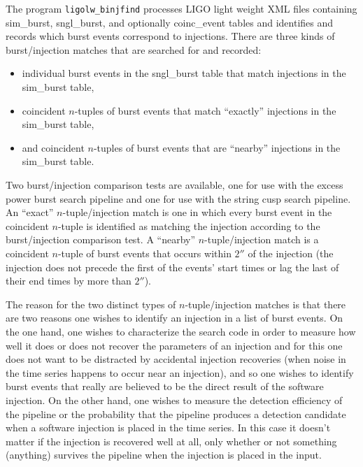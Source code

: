 \documentclass[10pt]{article}
\newcommand{\prog}[1]{\texttt{#1}}
\begin{document}
The program \prog{ligolw\_binjfind} processes LIGO light weight XML files
containing sim\_burst, sngl\_burst, and optionally coinc\_event tables and
identifies and records which burst events correspond to injections.  There
are three kinds of burst/injection matches that are searched for and
recorded:
\begin{itemize}
\item individual burst events in the sngl\_burst table that match
injections in the sim\_burst table,

\item coincident \(n\)-tuples of burst events that match ``exactly''
injections in the sim\_burst table,

\item and coincident \(n\)-tuples of burst events that are ``nearby''
injections in the sim\_burst table.
\end{itemize}
Two burst/injection comparison tests are available, one for use with the
excess power burst search pipeline and one for use with the string cusp
search pipeline.  An ``exact'' \(n\)-tuple/injection match is one in which
every burst event in the coincident \(n\)-tuple is identified as matching
the injection according to the burst/injection comparison test.  A
``nearby'' \(n\)-tuple/injection match is a coincident \(n\)-tuple of burst
events that occurs within \(\unit{2}{\second}\) of the injection (the
injection does not precede the first of the events' start times or lag the
last of their end times by more than \(\unit{2}{\second}\)).

The reason for the two distinct types of \(n\)-tuple/injection matches is
that there are two reasons one wishes to identify an injection in a list of
burst events.  On the one hand, one wishes to characterize the search code
in order to measure how well it does or does not recover the parameters of
an injection and for this one does not want to be distracted by accidental
injection recoveries (when noise in the time series happens to occur near
an injection), and so one wishes to identify burst events that really are
believed to be the direct result of the software injection.  On the other
hand, one wishes to measure the detection efficiency of the pipeline or the
probability that the pipeline produces a detection candidate when a
software injection is placed in the time series.  In this case it doesn't
matter if the injection is recovered well at all, only whether or not
something (anything) survives the pipeline when the injection is placed in
the input.
\end{document}
